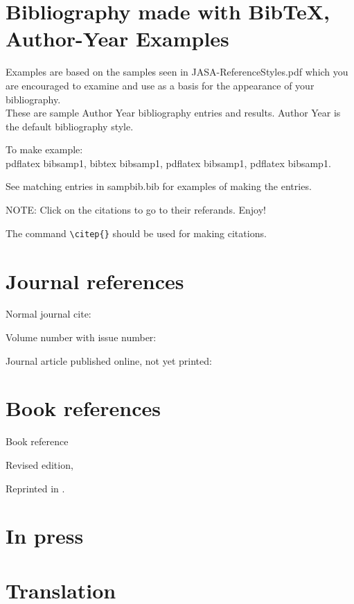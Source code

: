 \documentclass{JASA-EL}
\begin{document}
\section*{Bibliography made with BibTeX, Author-Year Examples}

Examples are based on the samples seen in JASA-ReferenceStyles.pdf which you
are encouraged to examine and use as a basis for the appearance of
your bibliography.\\
These are sample Author Year bibliography entries and results.
Author Year is the default bibliography style.

To make example:\\
 pdflatex bibsamp1, bibtex bibsamp1, pdflatex bibsamp1, pdflatex
 bibsamp1.

 See matching entries in sampbib.bib for examples of making the entries.

NOTE: Click on the citations to go to their referands. Enjoy!

The command \verb+\citep{}+ should be used for making citations.


\section*{Journal references}

Normal journal cite: \citep{joursamp1}

Volume number with issue number: \citep{joursamp3}


Journal article published online, not yet printed: \citep[published
online]{sampMisc2}

\section*{Book references}

Book reference \citep{booksamp1}

Revised edition, \citep{booksamp4}

Reprinted in \citep{sampReprint2}.

\section*{In press}

\citep[in press]{inpress2}

\citep[in press]{inpress3}


\section*{Translation}
\end{document}
